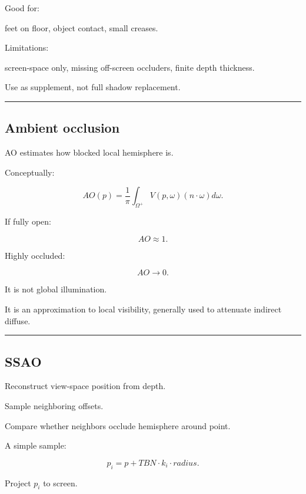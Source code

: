 Good for:

feet on floor, object contact, small creases.

Limitations:

screen-space only, missing off-screen occluders, finite depth thickness.

Use as supplement, not full shadow replacement.

\begin{center}\rule{0.5\linewidth}{0.5pt}\end{center}

\subsection{Ambient occlusion}\label{04-visual-computing-ii-ch040-ambient-occlusion}

\hypertarget{04-visual-computing-ii-ch040-ambient-occlusion}{}

AO estimates how blocked local hemisphere is.

Conceptually:

\[
\boxed{
AO(p)
=
\frac1\pi
\int_{\Omega^+}
V(p,\omega)
(n\cdot\omega)
d\omega.
}
\]

If fully open:

\[
AO\approx1.
\]

Highly occluded:

\[
AO\rightarrow0.
\]

It is not global illumination.

It is an approximation to local visibility, generally used to attenuate indirect diffuse.

\begin{center}\rule{0.5\linewidth}{0.5pt}\end{center}

\subsection{SSAO}\label{04-visual-computing-ii-ch040-ssao}

\hypertarget{04-visual-computing-ii-ch040-ssao}{}

Reconstruct view-space position from depth.

Sample neighboring offsets.

Compare whether neighbors occlude hemisphere around point.

A simple sample:

\[
p_i=
p+
TBN\cdot k_i\cdot radius.
\]

Project \(p_i\) to screen.

